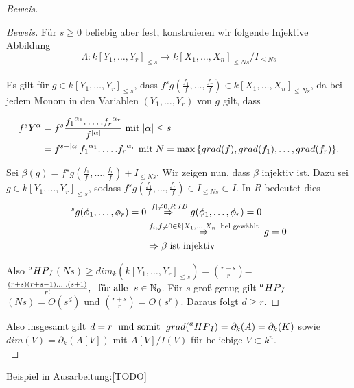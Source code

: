 \documentclass{article}
\newcommand*{\R}{k[X_{1},\ldots,X_{n}]}
\newcommand*{\indx}[2]{{#1}_{#2}}
\newcommand*{\potx}[2]{{#1}^{#2}}
\newcommand*{\N}{\mathbb{N}_0}
\newcommand*{\hp}[1]{$\prescript{a}{}{HP}_{#1}$}
\begin{document}
\begin{proof}[Beweis]
\begin{compactenum}
\begin{proof}[Beweis]
			Für $s\geq0$ beliebig aber fest, konstruieren wir folgende Injektive Abbildung
			\begin{displaymath}
			\Lambda :\indx{k[\indx{Y}{1},\ldots,\indx{Y}{r}]}{\leq s}\rightarrow\indx{\R}{\leq Ns}/\indx{I}{\leq Ns}
			\end{displaymath}
			\\
			Es gilt für $g\in \indx{k[\indx{Y}{1},\ldots,\indx{Y}{r}]}{\leq s}$, dass $\potx{f}{s}g(\frac{\indx{f}{1}}{f},\ldots,\frac{\indx{f}{r}}{f})\in \indx{\R}{\leq Ns}$, da  bei jedem Monom in den Variablen $(\indx{Y}{1},\ldots,\indx{Y}{r})$ von $g$ gilt, dass
			
			\begin{align*}
			\potx{f}{s}\potx{Y}{\alpha}&=\potx{f}{s}\frac{\potx{\indx{f}{1}}{\indx{\alpha}{1}}.\ldots.\potx{\indx{f}{r}}{\indx{\alpha}{r}}}{\potx{f}{|\alpha|}}\; \textnormal{mit}\; |\alpha|\leq s\\&
			=\potx{f}{s-|\alpha|}\potx{\indx{f}{1}}{\indx{\alpha}{1}}.\ldots.\potx{\indx{f}{r}}{\indx{\alpha}{r}} \; \textnormal{mit}\; N=\max{\{grad(f),grad(\indx{f}{1}),\ldots,grad(\indx{f}{r})\}}.
			\end{align*}
			
		Sei $\beta(g)=\potx{f}{s}g(\frac{\indx{f}{1}}{f},\ldots,\frac{\indx{f}{r}}{f})+\indx{I}{\leq Ns}$. Wir zeigen nun, dass $\beta$ injektiv ist. Dazu sei $g\in \indx{k[\indx{Y}{1},\ldots,\indx{Y}{r}]}{\leq s}$, sodass $\potx{f}{s}g(\frac{\indx{f}{1}}{f},\ldots,\frac{\indx{f}{r}}{f})\in\indx{I}{\leq Ns}\subset I$. In $R$ bedeutet dies
		\begin{align*}
		[f]^sg(\indx{\phi}{1},\ldots,\indx{\phi}{r})=0&\stackrel{[f]\neq0,R\;IB}{\Rightarrow} g(\indx{\phi}{1},\ldots,\indx{\phi}{r})=0\\&
		\stackrel{\indx{f}{i},f\neq0 \in \R \;\textnormal{bel gewählt}}{\Rightarrow}\;  g=0\\&
		\Rightarrow \beta\;\textnormal{ist injektiv}
		\end{align*} 
		
		Also \hp{I}$(Ns)\geq \indx{dim}{k}(\indx{k[\indx{Y}{1},\ldots,\indx{Y}{r}]}{\leq s})=\binom{r+s}{r}$=$\frac{(r+s)(r+s-1).\ldots.(s+1)}{r!},\; \textnormal{ für alle } \; s\in \N$. Für $s$ groß genug gilt \hp{I}$(Ns)=O(s^d)$ und $\binom{r+s}{r}=O(s^r)$. Daraus folgt $d\geq r$.
		\end{proof}
	\end{compactenum}
Also insgesamt gilt $d=r\; \textnormal{ und somit } \; grad (\textnormal{\hp{I}})=\indx{\partial}{k}(A)=\indx{\partial}{k}(K)$ sowie $dim(V)= \indx{\partial}{k}(A[V])$ mit $A[V]/I(V)$ für beliebige $V\subset k^n$.\\
\end{proof}
Beispiel in Ausarbeitung:[TODO]\\
\end{document}
